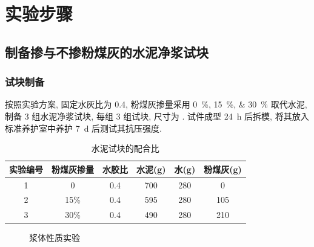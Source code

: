 
\section{实验步骤}

\subsection{制备掺与不掺粉煤灰的水泥净浆试块}

\subsubsection{试块制备}
按照实验方案, 固定水灰比为 \num{0.4}, 粉煤灰掺量采用 \qtylist{0; 15; 30}{\percent} 取代水泥, 制备 3 组水泥净浆试块, 每组 3 组试块, 尺寸为 .
试件成型 \SI{24}{\hour} 后拆模, 将其放入标准养护室中养护 \SI{7}{\day} 后测试其抗压强度.

\begin{table}
  \centering
  \caption{水泥试块的配合比}
  \begin{tabular}{|c|c|c|c|c|c|}
    \hline
    实验编号 & 粉煤灰掺量 & 水胶比 & 水泥(g) & 水(g) & 粉煤灰(g) \\ \hline
    1        & 0          & 0.4    & 700     & 280   & 0         \\ \hline
    2        & 15\%       & 0.4    & 595     & 280   & 105       \\ \hline
    3        & 30\%       & 0.4    & 490     & 280   & 210       \\ \hline
  \end{tabular}
  \label{tab:proportion}
\end{table}

\begin{figure}
  \centering
  \quad
  \caption{浆体性质实验}
\end{figure}

